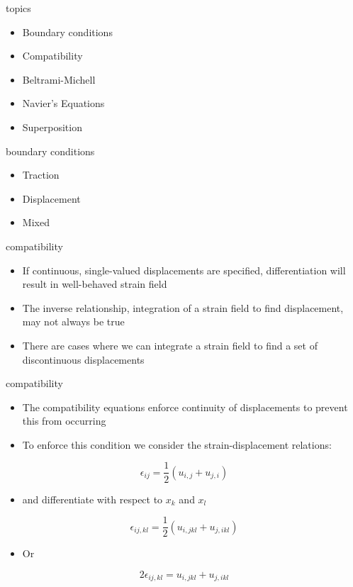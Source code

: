 \documentclass[
  letterpaper,
  ignorenonframetext,
  aspectratio=43,
  handout,
  12pt]{beamer}
\providecommand{\tightlist}{%
  \setlength{\itemsep}{0pt}\setlength{\parskip}{0pt}}
\providecommand{\tightlist}{%
\setlength{\itemsep}{0pt}\setlength{\parskip}{0pt}}
\begin{document}
\begin{frame}{topics}
\protect\hypertarget{topics-2}{}
\begin{itemize}
\tightlist
\item
  Boundary conditions
\item
  Compatibility
\item
  Beltrami-Michell
\item
  Navier's Equations
\item
  Superposition
\end{itemize}
\end{frame}

\begin{frame}{boundary conditions}
\protect\hypertarget{boundary-conditions}{}
\begin{itemize}
\tightlist
\item
  Traction
\item
  Displacement
\item
  Mixed
\end{itemize}
\end{frame}

\begin{frame}{compatibility}
\protect\hypertarget{compatibility}{}
\begin{itemize}
\tightlist
\item
  If continuous, single-valued displacements are specified,
  differentiation will result in well-behaved strain field
\item
  The inverse relationship, integration of a strain field to find
  displacement, may not always be true
\item
  There are cases where we can integrate a strain field to find a set of
  discontinuous displacements
\end{itemize}
\end{frame}

\begin{frame}{compatibility}
\protect\hypertarget{compatibility-1}{}
\begin{itemize}
\tightlist
\item
  The compatibility equations enforce continuity of displacements to
  prevent this from occurring
\item
  To enforce this condition we consider the strain-displacement
  relations:
\end{itemize}

\[\epsilon_{ij} = \frac{1}{2}(u_{i,j} + u_{j,i})\]

\begin{itemize}
\tightlist
\item
  and differentiate with respect to \(x_k\) and \(x_l\)
\end{itemize}

\[\epsilon_{ij,kl} = \frac{1}{2}(u_{i,jkl} + u_{j,ikl})\]

\begin{itemize}
\tightlist
\item
  Or
\end{itemize}

\[2\epsilon_{ij,kl} = u_{i,jkl} + u_{j, ikl}\]
\end{frame}
\end{document}
